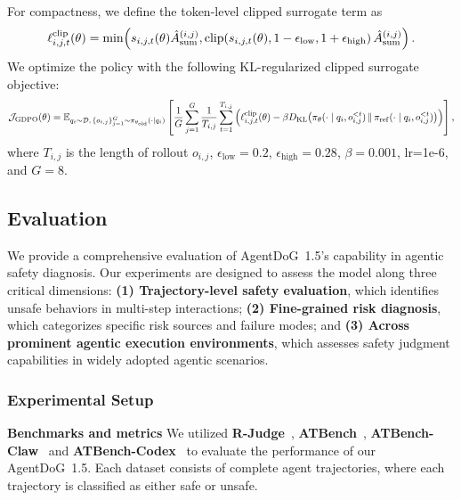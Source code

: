 \documentclass{llmxive}
\providecommand{\agentdog}{AgentDoG~1.5\xspace}
\begin{document}
For compactness, we define the token-level clipped surrogate term as
\begin{equation}
\small
\ell_{i,j,t}^{\mathrm{clip}}(\theta)
=
\min\!\left(
s_{i,j,t}(\theta)\hat A_{\mathrm{sum}}^{(i,j)},
\operatorname{clip}\!\left(
s_{i,j,t}(\theta),
1-\epsilon_{\mathrm{low}},
1+\epsilon_{\mathrm{high}}
\right)
\hat A_{\mathrm{sum}}^{(i,j)}
\right).
\label{eq:clipped-term}
\end{equation}
We optimize the policy with the following KL-regularized clipped
surrogate objective:
\begin{equation}
\small
\mathcal{J}_{\mathrm{GDPO}}(\theta)
=
\mathbb{E}_{q_i\sim\mathcal{D},\,\{o_{i,j}\}_{j=1}^{G}
\sim\pi_{\theta_{\mathrm{old}}}(\cdot\mid q_i)}
\left[
\frac{1}{G}\sum_{j=1}^{G}
\frac{1}{T_{i,j}}\sum_{t=1}^{T_{i,j}}
\left(
\ell_{i,j,t}^{\mathrm{clip}}(\theta)
-
\beta
D_{\mathrm{KL}}\!\left(
\pi_\theta(\cdot\mid q_i,o_{i,j}^{<t})
\,\|\, 
\pi_{\mathrm{ref}}(\cdot\mid q_i,o_{i,j}^{<t})
\right)
\right)
\right],
\label{eq:gdpo-objective}
\end{equation}
where $T_{i,j}$ is the length of rollout $o_{i,j}$,
$\epsilon_{\mathrm{low}}=0.2$, $\epsilon_{\mathrm{high}}=0.28$,
$\beta=0.001$, lr=1e-6, and $G=8$.

\subsection{Evaluation}
\label{subsec:evaluation}

We provide a comprehensive evaluation of \agentdog{}'s capability in agentic safety diagnosis. Our experiments are designed to assess the model along three critical dimensions: \textbf{(1) Trajectory-level safety evaluation}, which identifies unsafe behaviors in multi-step interactions; \textbf{(2) Fine-grained risk diagnosis}, which categorizes specific risk sources and failure modes; and \textbf{(3) Across prominent agentic execution environments}, which assesses safety judgment capabilities in widely adopted agentic scenarios.

\subsubsection{Experimental Setup}
\textbf{Benchmarks and metrics}
We utilized \textbf{R-Judge}~\citep{rjudge2024}, \textbf{ATBench}~\citep{li2026atbench}, \textbf{ATBench-Claw}~\citep{yang2026benchmarkstrajectorysafetyevaluation} and \textbf{ATBench-Codex}~\citep{yang2026benchmarkstrajectorysafetyevaluation} to evaluate the performance of our \agentdog{}. Each dataset consists of complete agent trajectories, where each trajectory is classified as either safe or unsafe. 
\end{document}
